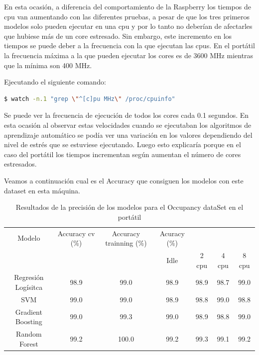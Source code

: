 \documentclass[a4paper, 12pt]{book}
\begin{document}
En esta ocasión, a diferencia del comportamiento de la Raspberry los tiempos de cpu van aumentando con las diferentes pruebas, a pesar de que los tres primeros modelos solo pueden ejecutar en una cpu y por lo tanto no deberían de afectarles que hubiese más de un core estresado. Sin embargo, este incremento en los tiempos se puede deber a la frecuencia con la que ejecutan las cpus. En el portátil la frecuencia máxima a la que pueden ejecutar los cores es de 3600 MHz mientras que la mínima son 400 MHz. 

Ejecutando el siguiente comando: 

\begin{lstlisting}[language=bash, showstringspaces=false]
  $ watch -n.1 "grep \"^[c]pu MHz\" /proc/cpuinfo"
\end{lstlisting}

Se puede ver la frecuencia de ejecución de todos los cores cada 0.1 segundos. En esta ocasión al observar estas velocidades cuando se ejecutaban los algoritmos de aprendizaje automático se podía ver una variación en los valores dependiendo del nivel de estrés que se estuviese ejecutando. Luego esto explicaría porque en el caso del portátil los tiempos incrementan según aumentan el número de cores estresados. 

Veamos a continuación cual es el Accuracy que consiguen los modelos con este dataset en esta máquina.

\begin{table}[]
\begin{adjustbox}{width=\textwidth}
\centering
    \begin{tabular}{c  c  c  c  c  c  c}
    \hline
    Modelo & Accuracy cv (\%) & Accuracy trainning (\%) & Acuracy (\%) & & & \\
    \cline{4-7}
      &  &   &  Idle & 2 cpu & 4 cpu & 8 cpu \\
     \hline
     Regresión Logísitca & 98.9 & 99.0 & 98.9 & 98.9 & 98.7 & 99.0\\
     SVM & 99.0 & 99.0 & 98.9 & 98.8 & 99.0 & 98.8\\
     Gradient Boosting & 99.0 & 99.3 & 99.0 & 98.9 & 98.8 & 99.0\\
     Random Forest & 99.2 & 100.0 & 99.2 & 99.3 & 99.1 & 99.2\\
    \hline
    \end{tabular}
\end{adjustbox}
\caption{Resultados de la precisión de los modelos para el Occupancy dataSet en el portátil}
\label{tab:acc_Occpc}
\end{table}
\end{document}
